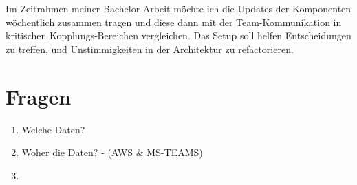 \documentclass[12pt,reqno]{amsart}
\begin{document}
\bigskip

Im Zeitrahmen meiner Bachelor Arbeit möchte ich die Updates der Komponenten \\ wöchentlich zusammen tragen und diese dann mit der Team-Kommunikation in kritischen Kopplungs-Bereichen vergleichen. 
Das Setup soll helfen Entscheidungen zu treffen, und Unstimmigkeiten in der Architektur zu refactorieren.


\bigskip

\section*{{\bf Fragen}}

\medskip

\begin{enumerate}

\item Welche Daten?
\item Woher die Daten? - (AWS \& MS-TEAMS)
\item 


\end{enumerate}
\end{document}
